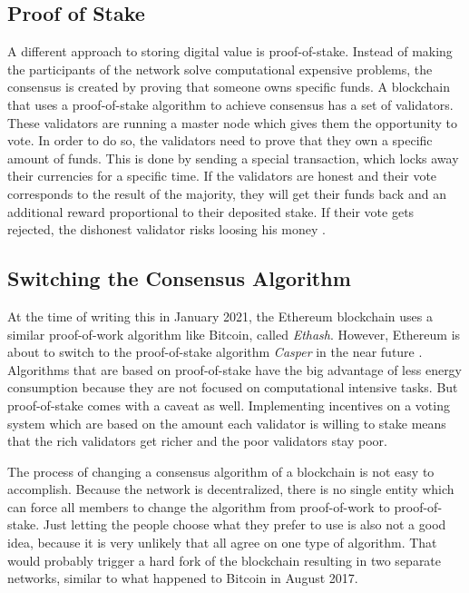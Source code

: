 \subsection{Proof of Stake}
A different approach to storing digital value is proof-of-stake. Instead of making the participants of the network solve computational expensive problems, the consensus is created by proving that someone owns specific funds. A blockchain that uses a proof-of-stake algorithm to achieve consensus has a set of validators. These validators are running a master node which gives them the opportunity to vote. In order to do so, the validators need to prove that they own a specific amount of funds. This is done by sending a special transaction, which locks away their currencies for a specific time. If the validators are honest and their vote corresponds to the result of the majority, they will get their funds back and an additional reward proportional to their deposited stake. If their vote gets rejected, the dishonest validator risks loosing his money \cite{AntonopoulosWood2018}.

\subsection{Switching the Consensus Algorithm}
At the time of writing this in January 2021, the Ethereum blockchain uses a similar proof-of-work algorithm like Bitcoin, called \textit{Ethash}. However, Ethereum is about to switch to the proof-of-stake algorithm \textit{Casper} in the near future \cite{Twitter2018}. Algorithms that are based on proof-of-stake have the big advantage of less energy consumption because they are not focused on computational intensive tasks. But proof-of-stake comes with a caveat as well. Implementing incentives on a voting system which are based on the amount each validator is willing to stake means that the rich validators get richer and the poor validators stay poor.

The process of changing a consensus algorithm of a blockchain is not easy to accomplish. Because the network is decentralized, there is no single entity which can force all members to change the algorithm from proof-of-work to proof-of-stake. Just letting the people choose what they prefer to use is also not a good idea, because it is very unlikely that all agree on one type of algorithm. That would probably trigger a hard fork of the blockchain resulting in two separate networks, similar to what happened to Bitcoin in August 2017.

